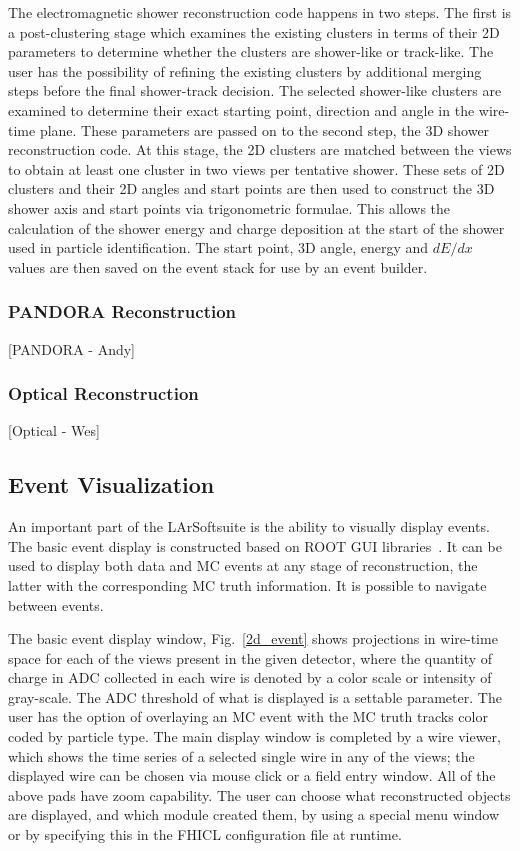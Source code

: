 \documentclass[12pt]{elsarticle}
\newcommand{\larsoft}{LArSoft}
\begin{document}
The electromagnetic shower reconstruction code happens in two steps. The first is a post-clustering stage which examines the existing clusters in terms of their 2D parameters to determine whether the clusters are shower-like or track-like. The user has the possibility of refining the existing clusters by additional merging steps before the final shower-track decision. The selected shower-like clusters are examined to determine their exact starting point, direction and angle in the wire-time plane. These parameters are passed on to the second step, the 3D shower reconstruction code. At this stage, the 2D clusters are matched between the views to obtain at least one cluster in two views per tentative shower. These sets of 2D clusters and their 2D angles and start points are then used to construct the 3D shower axis and start points via trigonometric formulae. This allows the calculation of the shower energy and charge deposition at the start of the shower used in particle identification. The start point, 3D angle, energy and $dE/dx$ values are then saved on the event stack for use by an event builder.

\subsubsection{PANDORA Reconstruction}
[PANDORA - Andy]
\subsubsection{Optical Reconstruction}
[Optical - Wes]

\subsection{Event Visualization}
An important part of the \larsoft suite is the ability to visually display events. The basic event display is constructed based on ROOT GUI libraries~\cite{ROOT}.
It can be used to display both data and MC events at any stage of reconstruction, the latter with the corresponding MC truth information. It is possible to navigate between events.

The basic event display window, Fig.~\ref{2d_event} shows projections in wire-time space for each of the views present in the given detector, where the quantity of charge in ADC collected in each wire is denoted by a color scale or intensity of gray-scale. The ADC threshold of what is displayed is a settable parameter. 
The user has the option of overlaying an MC event with the MC truth tracks color coded by particle type. The main display window is completed by a wire viewer, which shows the time series of a selected single wire in any of the views; the displayed wire can be chosen via mouse click or a field entry window.
All of the above pads have zoom capability. The user can choose what reconstructed objects are displayed, and which module created them, by using a special menu window or by specifying this in the FHICL configuration file at runtime. 
\end{document}
